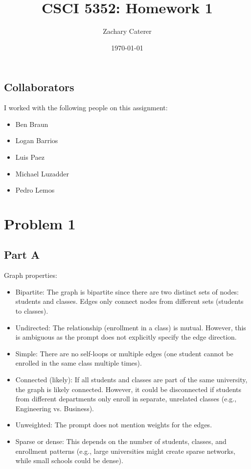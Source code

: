 \documentclass[12pt]{article}
\title{CSCI 5352: Homework 1}
\author{Zachary Caterer}
\date{\today}
\begin{document}
\maketitle

\subsection*{Collaborators}
I worked with the following people on this assignment:

\begin{itemize}
    \item Ben Braun
    \item Logan Barrios
    \item Luis Paez
    \item Michael Luzadder
    \item Pedro Lemos
\end{itemize}

\section*{Problem 1}
\subsection*{Part A}
Graph properties:
\begin{itemize}
    \item Bipartite: The graph is bipartite since there are two distinct sets of nodes: students and classes. Edges only connect nodes from different sets (students to classes).
    \item Undirected: The relationship (enrollment in a class) is mutual. However, this is ambiguous as the prompt does not explicitly specify the edge direction.
    \item Simple: There are no self-loops or multiple edges (one student cannot be enrolled in the same class multiple times).
    \item Connected (likely): If all students and classes are part of the same university, the graph is likely connected. However, it could be disconnected if students from different departments only enroll in separate, unrelated classes (e.g., Engineering vs. Business).
    \item Unweighted: The prompt does not mention weights for the edges.
    \item Sparse or dense: This depends on the number of students, classes, and enrollment patterns (e.g., large universities might create sparse networks, while small schools could be dense).
\end{itemize}
\end{document}
